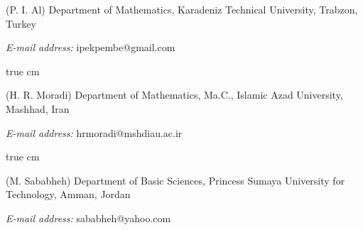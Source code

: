 \documentclass[12pt,twoside,reqno]{amsart}
\numberwithin{equation}{section}
\begin{document}
{\tiny (P. I. Al) Department of Mathematics, Karadeniz Technical University, Trabzon, Turkey}
	
{\tiny\textit{E-mail address:} ipekpembe@gmail.com}




 true cm 	

{\tiny (H. R. Moradi) Department of Mathematics, Ma.C., Islamic Azad University, Mashhad, Iran 
	
\textit{E-mail address:} hrmoradi@mshdiau.ac.ir}

 true cm 	

{\tiny (M. Sababheh) Department of Basic Sciences, Princess Sumaya University for Technology, Amman, Jordan
	
\textit{E-mail address:} sababheh@yahoo.com}
\end{document}

